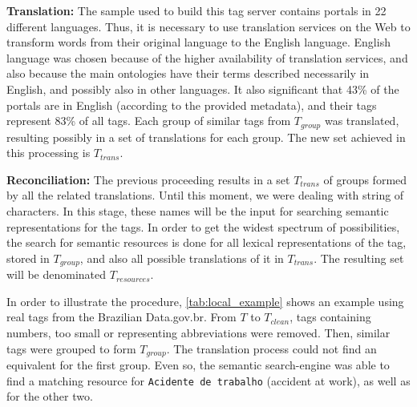 \noindent \textbf{Translation:} The sample used to build this tag server contains portals in 22 different languages.
Thus, it is necessary to use translation services on the Web to transform words from their original language to the English language.
English language was chosen because of the higher availability of translation services, and also because the main ontologies have their terms described necessarily in English, and possibly also in other languages.
It also significant that 43\% of the portals are in English (according to the provided metadata), and their tags represent 83\% of all tags.
Each group of similar tags from $T_{group}$ was translated, resulting possibly in a set of translations for each group.
The new set achieved in this processing is $T_{trans}$.

\noindent \textbf{Reconciliation:} The previous proceeding results in a set $T_{trans}$ of groups formed by all the related translations.
Until this moment, we were dealing with string of characters.
In this stage, these names will be the input for searching semantic representations for the tags.
In order to get the widest spectrum of possibilities, the search for semantic resources is done for all lexical representations of the tag, stored in $T_{group}$, and also all possible translations of it in $T_{trans}$.
The resulting set will be denominated $T_{resources}$.


In order to illustrate the procedure, \autoref{tab:local_example} shows an example using real tags from the Brazilian Data.gov.br.
From $T$ to $T_{clean}$, tags containing numbers, too small or representing abbreviations were removed.
Then, similar tags were grouped to form $T_{group}$.
The translation process could not find an equivalent for the first group.
Even so, the semantic search-engine was able to find a matching resource for \texttt{Acidente de trabalho} (accident at work), as well as for the other two.

